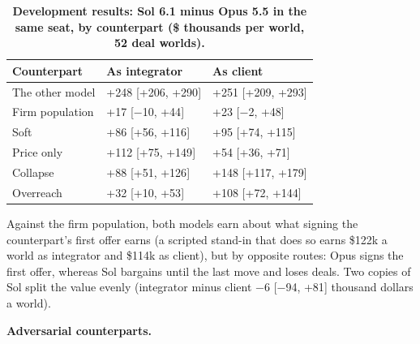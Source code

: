 \renewcommand{\thetable}{E.3}
\begin{longtable}[]{@{}
  >{\raggedright\arraybackslash}p{}
  >{\raggedleft\arraybackslash}p{}
  >{\raggedleft\arraybackslash}p{}@{}}
\caption{\textbf{Development results: Sol 6.1 minus Opus 5.5 in the same seat, by counterpart (\$ thousands per world, 52 deal worlds).}}\label{tab:E.3}\tabularnewline
\toprule\noalign{}
\begin{minipage}[b]{\linewidth}\raggedright
Counterpart
\end{minipage} & \begin{minipage}[b]{\linewidth}\raggedleft
As integrator
\end{minipage} & \begin{minipage}[b]{\linewidth}\raggedleft
As client
\end{minipage} \\
\midrule\noalign{}
\endhead
\bottomrule\noalign{}
\endlastfoot
The other model & +248 {[}+206, +290{]} & +251 {[}+209, +293{]} \\
Firm population & +17 {[}−10, +44{]} & +23 {[}−2, +48{]} \\
Soft & +86 {[}+56, +116{]} & +95 {[}+74, +115{]} \\
Price only & +112 {[}+75, +149{]} & +54 {[}+36, +71{]} \\
Collapse & +88 {[}+51, +126{]} & +148 {[}+117, +179{]} \\
Overreach & +32 {[}+10, +53{]} & +108 {[}+72, +144{]} \\
\end{longtable}

Against the firm population, both models earn about what signing the counterpart's first offer earns (a scripted
stand-in that does so earns \$122k a world as integrator and \$114k as client), but by opposite routes: Opus signs the
first offer, whereas Sol bargains until the last move and loses deals. Two copies of Sol split the value evenly
(integrator minus client −6 {[}−94, +81{]} thousand dollars a world).

\textbf{Adversarial counterparts.}


